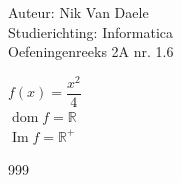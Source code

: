 \documentclass[a4paper]{article}
\begin{document}
  
\noindent \large Auteur: Nik Van Daele \\
\noindent \large Studierichting: Informatica\\
\noindent \large Oefeningenreeks 2A nr. 1.6\\

\medskip

\normalsize

$f(x) = \dfrac{x^2}{4}$\\

$\operatorname{dom}f = \mathbb{R}$\\

$\operatorname{Im}f = \mathbb{R}^+$

\begin{thebibliography}{999}
\end{thebibliography}
\end{document}
